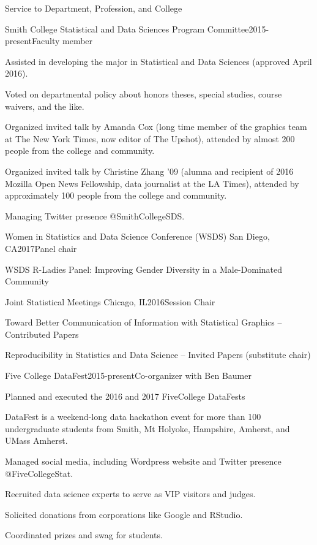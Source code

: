 \documentclass{resume} %
\begin{document}
\begin{rSection}{Service to Department, Profession, and College}

\begin{rSubsection}{Smith College Statistical and Data Sciences Program Committee}{}{2015-present}{Faculty member}
\item Assisted in developing the major in Statistical and Data Sciences (approved April 2016).
\item Voted on departmental policy about honors theses, special studies, course waivers, and the like. 
\item Organized invited talk by Amanda Cox (long time member of the graphics team at The New York Times, now editor of The Upshot), attended by almost 200 people from the college and community. 
\item Organized invited talk by Christine Zhang '09 (alumna and recipient of 2016 Mozilla Open News Fellowship, data journalist at the LA Times), attended by approximately 100 people from the college and community. 
\item Managing Twitter presence @SmithCollegeSDS. 
\end{rSubsection}


\begin{rSubsection}{Women in Statistics and Data Science Conference (WSDS)}{ San Diego, CA}{2017}{Panel chair}
\item WSDS R-Ladies Panel: Improving Gender Diversity in a Male-Dominated Community
\end{rSubsection}

\begin{rSubsection}{Joint Statistical Meetings}{ Chicago, IL}{2016}{Session Chair}
\item Toward Better Communication of Information with Statistical Graphics -- Contributed Papers
\item Reproducibility in Statistics and Data Science -- Invited Papers (substitute chair)
\end{rSubsection}


\begin{rSubsection}{Five College DataFest}{}{2015-present}{Co-organizer with Ben Baumer }
\item Planned and executed the 2016 and 2017 FiveCollege DataFests
\item DataFest is a weekend-long data hackathon event for more than 100 undergraduate students from Smith, Mt Holyoke, Hampshire, Amherst, and UMass Amherst. 
\item Managed social media, including Wordpress website and Twitter presence @FiveCollegeStat. 
\item Recruited data science experts to serve as VIP visitors and judges. 
\item Solicited donations from corporations like Google and RStudio. 
\item Coordinated prizes and swag for students. 
\end{rSubsection}


\end{rSection}
\end{document}
